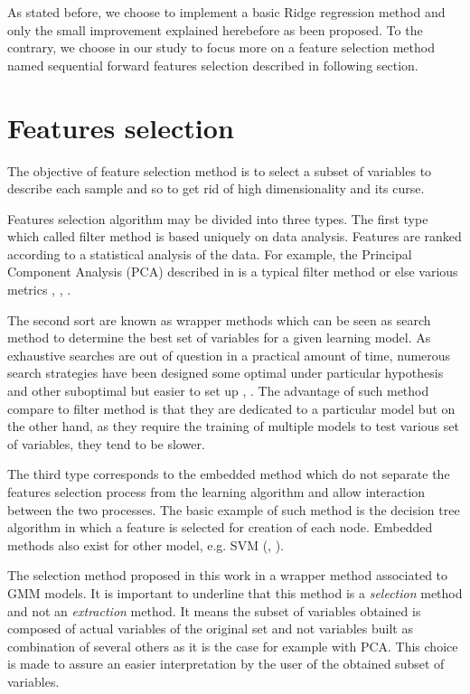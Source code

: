 \documentclass[a4paper,11pt,DIV=16]{scrartcl}
\begin{document}
    As stated before, we choose to implement a basic Ridge regression method and only the small improvement explained herebefore as been proposed. To the contrary, we choose in our study to focus more on a feature selection method named sequential forward features selection described in following section.

\section{Features selection}

The objective of feature selection method is to select a subset of variables to describe each sample and so to get rid of high dimensionality and its curse.

Features selection algorithm may be divided into three types. The first type which called filter method is based uniquely on data analysis. Features are ranked according to a statistical analysis of the data. For example, the Principal Component Analysis (PCA) described in \cite{jimenez1998supervised} is a typical filter method or else various metrics \cite{bruzzone1995extension}, \cite{biesiada2007feature}, \cite{demir2008phase}.

The second sort are known as wrapper methods which can be seen as search method to determine the best set of variables for a given learning model. As exhaustive searches are out of question in a practical amount of time, numerous search strategies have been designed some optimal under particular hypothesis \cite{narendra1977branch} and other suboptimal but easier to set up \cite{whitney1971direct}, \cite{somol1999adaptive}. The advantage of such method compare to filter method is that they are dedicated to a particular model but on the other hand, as they require the training of multiple models to test various set of variables, they tend to be slower.

The third type corresponds to the embedded method which do not separate the features selection process from the learning algorithm and allow interaction between the two processes. The basic example of such method is the decision tree algorithm in which a feature is selected for creation of each node. Embedded methods also exist for other model, e.g. SVM (\cite{guyon2002gene}, \cite{weston2003use}).

The selection method proposed in this work in a wrapper method associated to GMM models. It is important to underline that this method is a \emph{selection} method and not an \emph{extraction} method. It means the subset of variables obtained is composed of actual variables of the original set and not variables built as combination of several others as it is the case for example with PCA. This choice is made to assure an easier interpretation by the user of the obtained subset of variables.
\end{document}
